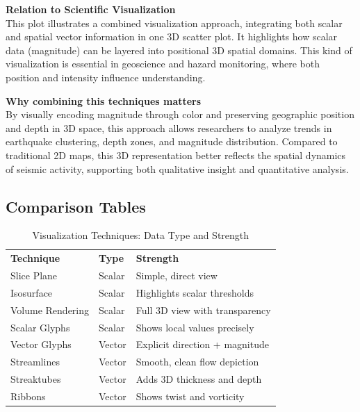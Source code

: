 \documentclass[11pt]{article}
\begin{document}
	\vspace{0.5em}
	\noindent
	\textbf{Relation to Scientific Visualization} \\
	This plot illustrates a combined visualization approach, integrating both scalar and spatial vector information in one 3D scatter plot. It highlights how scalar data (magnitude) can be layered into positional 3D spatial domains. This kind of visualization is essential in geoscience and hazard monitoring, where both position and intensity influence understanding.
	
	\vspace{0.5em}
	\noindent
	\textbf{Why combining this techniques matters} \\
	By visually encoding magnitude through color and preserving geographic position and depth in 3D space, this approach allows researchers to analyze trends in earthquake clustering, depth zones, and magnitude distribution. Compared to traditional 2D maps, this 3D representation better reflects the spatial dynamics of seismic activity, supporting both qualitative insight and quantitative analysis.
	
	
	\subsection{Comparison Tables}
	
		\begin{table}[H]
		\centering
		\caption{Visualization Techniques: Data Type and Strength}
		\renewcommand{\arraystretch}{1.3}
		\begin{tabular}{|l|l|l|}
			\hline
			\textbf{Technique} & \textbf{Type} & \textbf{Strength} \\

			Slice Plane        & Scalar        & Simple, direct view \\

			Isosurface         & Scalar        & Highlights scalar thresholds \\

			Volume Rendering   & Scalar        & Full 3D view with transparency \\

			Scalar Glyphs      & Scalar        & Shows local values precisely \\

			Vector Glyphs      & Vector        & Explicit direction + magnitude \\

			Streamlines        & Vector        & Smooth, clean flow depiction \\

			Streaktubes        & Vector        & Adds 3D thickness and depth \\

			Ribbons            & Vector        & Shows twist and vorticity \\
			\hline
		\end{tabular}
	\end{table}
	
\end{document}

